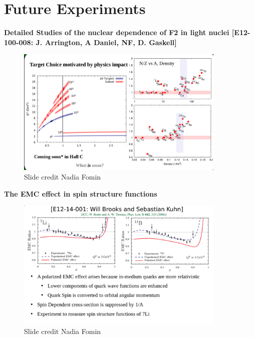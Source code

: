 \documentclass[12pt,usenames,dvipsnames]{beamer}
\begin{document}
\section{Future Experiments}
\begin{frame}{}

\small{\textbf{Detailed Studies of the nuclear dependence of F2 in light nuclei 
	[E12-100-008: J. Arrington, A Daniel, NF, D. Gaskell]}}
\begin{figure}
	\includegraphics[width=10cm]{../images/moreEMC.png}
	\caption*{Slide credit Nadia Fomin}
\end{figure}
\end{frame}
\begin{frame}{}

\centering \textbf{The EMC effect in spin structure functions}
\begin{figure}
	\includegraphics[width=10cm]{../images/moreEMC1.png}
	\caption*{Slide credit Nadia Fomin}
\end{figure}

\end{frame}
\end{document}
